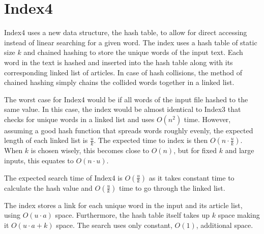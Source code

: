 \section{Index4}
\label{section:Index4}

Index4 uses a new data structure, the hash table, to allow for direct accessing instead of linear searching for a given word. The index uses a hash table of static size $k$ and chained hashing to store the unique words of the input text. Each word in the text is hashed and inserted into the hash table along with its corresponding linked list of articles. In case of hash collisions, the method of chained hashing simply chains the collided words together in a linked list. 

The worst case for Index4 would be if all words of the input file hashed to the same value. In this case, the index would be almost identical to Index3 that checks for unique words in a linked list and uses $O(n^2)$ time. However, assuming a good hash function that spreads words roughly evenly, the expected length of each linked list is $\frac{u}{k}$. The expected time to index is then $O(n\cdot \frac{u}{k})$. When $k$ is chosen wisely, this becomes close to $O(n)$, but for fixed $k$ and large inputs, this equates to $O(n\cdot u)$. 



The expected search time of Index4 is $O(\frac{u}{k})$ as it takes constant time to calculate the hash value and $O(\frac{u}{k})$ time to go through the linked list. 

The index stores a link for each unique word in the input and its article list, using $O(u\cdot a)$ space. Furthermore, the hash table itself takes up $k$ space making it $O(u\cdot a+k)$ space. The search uses only constant, $O(1)$, additional space. 
